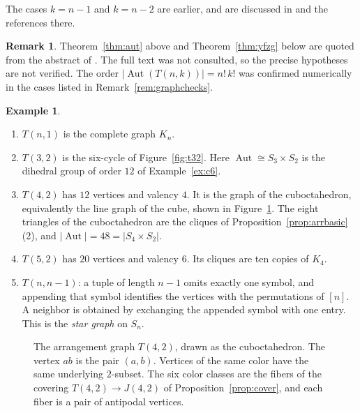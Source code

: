 \documentclass[12pt,letterpaper]{article}
\numberwithin{equation}{section}
\theoremstyle{definition}
\newtheorem{example}[theorem]{Example}
\newtheorem{vremark}{Remark}
\DeclareMathOperator{\autt}{Aut}
\begin{document}
The cases $k=n-1$ and $k=n-2$ are earlier, and are discussed in \cite{YFZG21,Zh11} and the references there.
\begin{vremark}\label{rem:yfzg}
Theorem~\ref{thm:aut} above and Theorem~\ref{thm:yfzg} below are quoted from the abstract of \cite{YFZG21}. The full text was not consulted, so the precise hypotheses are not verified. The order $|\autt(T(n,k))|=n!\,k!$ was confirmed numerically in the cases listed in Remark~\ref{rem:graphchecks}.
\end{vremark}
\begin{example}\label{ex:smallarr}
\begin{enumerate}
\item $T(n,1)$ is the complete graph $K_n$.
\item $T(3,2)$ is the six-cycle of Figure~\ref{fig:t32}. Here $\autt\cong S_3\times S_2$ is the dihedral group of order $12$ of Example~\ref{ex:c6}.
\item $T(4,2)$ has $12$ vertices and valency $4$. It is the graph of the cuboctahedron, equivalently the line graph of the cube, shown in Figure~\ref{fig:t42}. The eight triangles of the cuboctahedron are the cliques of Proposition~\ref{prop:arrbasic}(2), and $|\autt|=48=|S_4\times S_2|$.
\item $T(5,2)$ has $20$ vertices and valency $6$. Its cliques are ten copies of $K_4$.
\item $T(n,n-1)$: a tuple of length $n-1$ omits exactly one symbol, and appending that symbol identifies the vertices with the permutations of $[n]$. A neighbor is obtained by exchanging the appended symbol with one entry. This is the \emph{star graph} on $S_n$.
\end{enumerate}
\end{example}
\begin{figure}[ht]\centering
{}
\caption{The arrangement graph $T(4,2)$, drawn as the cuboctahedron. The vertex $ab$ is the pair $(a,b)$. Vertices of the same color have the same underlying $2$-subset. The six color classes are the fibers of the covering $T(4,2)\to J(4,2)$ of Proposition~\ref{prop:cover}, and each fiber is a pair of antipodal vertices.}\label{fig:t42}
\end{figure}
\end{document}
